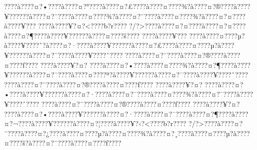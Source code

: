 \documentclass[11pt, openany]{book}
\begin{document}
???\textbar{}?à???\textbar{}?¤?•???\textbar{}?à???\textbar{}?¤?°???\textbar{}?à???\textbar{}?¤?£???\textbar{}?à???\textbar{}?¤???\textbar{}?¾?à???\textbar{}?¤?®???\textbar{}?à???\textbar{}?¥?????\textbar{}?à???\textbar{}?¤?¨???\textbar{}?à???\textbar{}?¤???\textbar{}?¾?à???\textbar{}?¤?¨???\textbar{}?à???\textbar{}?¤???\textbar{}?¾?à???\textbar{}?¤?¤???\textbar{}?à???\textbar{}?¥???
???\textbar{}?à???\textbar{}?¥?¤?\textless{}???\textbar{}?b?r???\textbar{}?
?/?\textgreater{}???\textbar{}?à???\textbar{}?¤?¤???\textbar{}?à???\textbar{}?¤?¤???\textbar{}?à???\textbar{}?¤?¶???\textbar{}?à???\textbar{}?¥?????\textbar{}?à???\textbar{}?¤???\textbar{}?š???\textbar{}?
???\textbar{}?à???\textbar{}?¥???
???\textbar{}?à???\textbar{}?¤???\textbar{}?µ?à???\textbar{}?¥???\textbar{}?ˆ?à???\textbar{}?¤?·???\textbar{}?à???\textbar{}?¥?????\textbar{}?à???\textbar{}?¤?£???\textbar{}?à???\textbar{}?¤???\textbar{}?µ?à???\textbar{}?¥?????\textbar{}?à???\textbar{}?¤?¯???\textbar{}?à???\textbar{}?¥???\textbar{}?ˆ???\textbar{}?
???\textbar{}?à???\textbar{}?¤?¨???\textbar{}?à???\textbar{}?¤?®???\textbar{}?à???\textbar{}?¤???\textbar{}?ƒ???\textbar{}?
???\textbar{}?à???\textbar{}?¥?¤?
???\textbar{}?à???\textbar{}?¤?•???\textbar{}?à???\textbar{}?¤???\textbar{}?¾?à???\textbar{}?¤?¶???\textbar{}?à???\textbar{}?¥?????\textbar{}?à???\textbar{}?¤?¯???\textbar{}?à???\textbar{}?¤???\textbar{}?ª?à???\textbar{}?¥?????\textbar{}?à???\textbar{}?¤?¯???\textbar{}?à???\textbar{}?¥???\textbar{}?ˆ???\textbar{}?
???\textbar{}?à???\textbar{}?¤?¨???\textbar{}?à???\textbar{}?¤?®???\textbar{}?à???\textbar{}?¤???\textbar{}?ƒ???\textbar{}?
???\textbar{}?à???\textbar{}?¥?¤?
???\textbar{}?à???\textbar{}?¤?•???\textbar{}?à???\textbar{}?¥?????\textbar{}?à???\textbar{}?¤?·???\textbar{}?à???\textbar{}?¤?¯???\textbar{}?à???\textbar{}?¤???\textbar{}?¾?à???\textbar{}?¤?¯???\textbar{}?à???\textbar{}?¥???\textbar{}?ˆ???\textbar{}?
???\textbar{}?à???\textbar{}?¤?¨???\textbar{}?à???\textbar{}?¤?®???\textbar{}?à???\textbar{}?¤???\textbar{}?ƒ???\textbar{}?
???\textbar{}?à???\textbar{}?¥?¤?
???\textbar{}?à???\textbar{}?¤?•???\textbar{}?à???\textbar{}?¥?????\textbar{}?à???\textbar{}?¤?·???\textbar{}?à???\textbar{}?¤?¯???\textbar{}?à???\textbar{}?¤?¶???\textbar{}?à???\textbar{}?¤?¬???\textbar{}?à???\textbar{}?¥?????\textbar{}?à???\textbar{}?¤?¦???\textbar{}?à???\textbar{}?¥?‹?\textless{}???\textbar{}?b?r???\textbar{}?
?/?\textgreater{}???\textbar{}?à???\textbar{}?¤?¨???\textbar{}?à???\textbar{}?¤?¿???\textbar{}?à???\textbar{}?¤???\textbar{}?µ?à???\textbar{}?¤???\textbar{}?¾?à???\textbar{}?¤?¸???\textbar{}?à???\textbar{}?¤???\textbar{}?µ?à???\textbar{}?¤???\textbar{}?š?à???\textbar{}?¤?¨???\textbar{}?à???\textbar{}?¤???\textbar{}?ƒ???\textbar{}?
\end{document}

